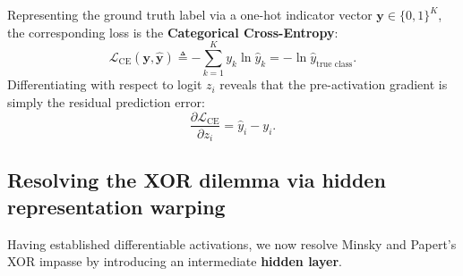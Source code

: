 Representing the ground truth label via a one-hot indicator vector $\mathbf{y} \in \{0, 1\}^K$, the corresponding loss is the \textbf{Categorical Cross-Entropy}:
\begin{equation}
\mathcal{L}_{\text{CE}}(\mathbf{y}, \hat{\mathbf{y}}) \triangleq -\sum_{k=1}^K y_k \ln \hat{y}_k = -\ln \hat{y}_{\text{true class}}.
\label{eq:categorical_cross_entropy}
\end{equation}
Differentiating with respect to logit $z_i$ reveals that the pre-activation gradient is simply the residual prediction error:
\begin{equation}
\frac{\partial \mathcal{L}_{\text{CE}}}{\partial z_i} = \hat{y}_i - y_i.
\label{eq:softmax_cross_entropy_gradient}
\end{equation}

\subsection{Resolving the XOR dilemma via hidden representation warping}
\label{sec:resolving_xor_hidden_representations}

Having established differentiable activations, we now resolve Minsky and Papert's XOR impasse by introducing an intermediate \textbf{hidden layer}.

